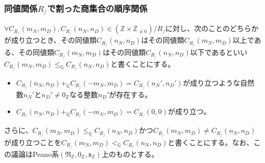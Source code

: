 \documentclass[dvipdfmx]{jsarticle}
\begin{document}
\subsubsection{同値関係$R_{/}$で割った商集合の順序関係}%
\begin{dfn}
$\forall C_{R_{/}}\left( m_{N},m_{D} \right),C_{R_{/}}\left( n_{N},n_{D} \right) \in \left( \mathbb{Z} \times \mathbb{Z}_{\neq 0} \right) /R_{/} $に対し、次のことのどちらかが成り立つとき、その同値類$C_{R_{/}}\left( n_{N},n_{D} \right)$はその同値類$C_{R_{/}}\left( m_{N},m_{D} \right)$以上である、その同値類$C_{R_{/}}\left( m_{N},m_{D} \right)$はその同値類$C_{R_{/}}\left( n_{N},n_{D} \right)$以下であるといい$C_{R_{/}}\left( m_{N},m_{D} \right) \leq_{\mathbb{Q}}C_{R_{/}}\left( n_{N},n_{D} \right)$と書くことにする。
\begin{itemize}
\item
  $C_{R_{/}}\left( n_{N},n_{D} \right) +_{\mathbb{Q}}C_{R_{/}}\left( - m_{N},m_{D} \right) = C_{R_{/}}\left( n_{N}',n_{D}' \right)$が成り立つような自然数$n_{N}'$と$n_{D}' \neq 0_{\mathbb{Z}}$なる整数$n_{D}'$が存在する。
\item
  $C_{R_{/}}\left( n_{N},n_{D} \right) +_{\mathbb{Q}}C_{R_{/}}\left( - m_{N},m_{D} \right) = C_{R_{/}}(0,0)$が成り立つ。
\end{itemize}\par
さらに、$C_{R_{/}}\left( m_{N},m_{D} \right) \leq_{\mathbb{Q}}C_{R_{/}}\left( n_{N},n_{D} \right)$かつ$C_{R_{/}}\left( m_{N},m_{D} \right) \neq C_{R_{/}}\left( n_{N},n_{D} \right)$が成り立つことを$C_{R_{/}}\left( m_{N},m_{D} \right) <_{\mathbb{Q}}C_{R_{/}}\left( n_{N},n_{D} \right)$と書くことにする。なお、この議論はPeano系$\left( \mathfrak{N}_{\mathbb{Z}},0_{\mathbb{Z}},\mathfrak{s}_{\mathbb{Z}} \right)$上のものとする。
\end{dfn}
\end{document}
